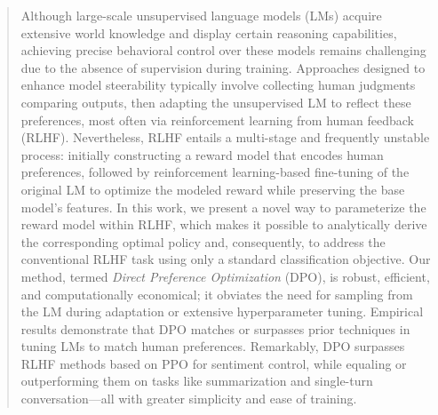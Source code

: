 \begin{abstract}
Although large-scale unsupervised language models (LMs) acquire extensive world knowledge and display certain reasoning capabilities, achieving precise behavioral control over these models remains challenging due to the absence of supervision during training. Approaches designed to enhance model steerability typically involve collecting human judgments comparing outputs, then adapting the unsupervised LM to reflect these preferences, most often via reinforcement learning from human feedback (RLHF). Nevertheless, RLHF entails a multi-stage and frequently unstable process: initially constructing a reward model that encodes human preferences, followed by reinforcement learning-based fine-tuning of the original LM to optimize the modeled reward while preserving the base model's features. In this work, we present a novel way to parameterize the reward model within RLHF, which makes it possible to analytically derive the corresponding optimal policy and, consequently, to address the conventional RLHF task using only a standard classification objective. Our method, termed \textit{Direct Preference Optimization} (DPO), is robust, efficient, and computationally economical; it obviates the need for sampling from the LM during adaptation or extensive hyperparameter tuning. Empirical results demonstrate that DPO matches or surpasses prior techniques in tuning LMs to match human preferences. Remarkably, DPO surpasses RLHF methods based on PPO for sentiment control, while equaling or outperforming them on tasks like summarization and single-turn conversation—all with greater simplicity and ease of training.
\end{abstract}

